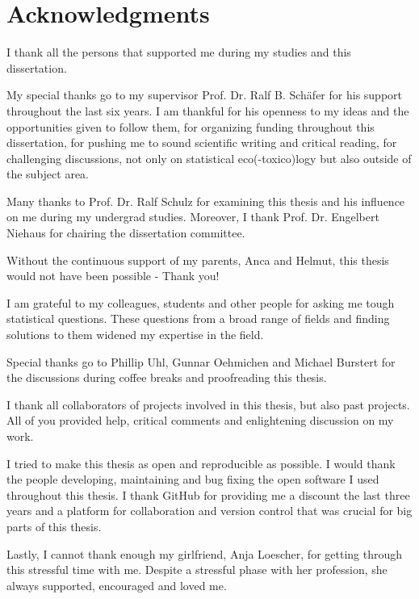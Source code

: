 


\begingroup
\let\clearpage\relax
\let\cleardoublepage\relax
\let\cleardoublepage\relax

\chapter*{Acknowledgments}
\thispagestyle{empty}

I thank all the persons that supported me during my studies and this dissertation.

\noindent My special thanks go to my supervisor Prof. Dr. Ralf B. Schäfer for his support throughout the last six years. 
I am thankful for his openness to my ideas and the opportunities given to follow them, 
for organizing funding throughout this dissertation, 
for pushing me to sound scientific writing and critical reading, 
for challenging discussions, not only on statistical eco(-toxico)logy but also outside of the subject area.

\noindent Many thanks to Prof. Dr. Ralf Schulz for examining this thesis and his influence on me during my undergrad studies.
Moreover, I thank Prof. Dr. Engelbert Niehaus for chairing the dissertation committee.

\noindent Without the continuous support of my parents, Anca and Helmut, this thesis would not have been possible - Thank you!

\noindent I am grateful to my colleagues, students and other people for asking me tough statistical questions. 
These questions from a broad range of fields and finding solutions to them widened my expertise in the field.

\noindent Special thanks go to Phillip Uhl, Gunnar Oehmichen and Michael Burstert for the discussions during coffee breaks and proofreading this thesis.

\noindent I thank all collaborators of projects involved in this thesis, but also past projects. All of you provided help, critical comments and enlightening discussion on my work.

\noindent I tried to make this thesis as open and reproducible as possible. I would thank the people developing, maintaining and bug fixing the open software I used throughout this thesis. I thank GitHub for providing me a discount the last three years and a platform for collaboration and version control that was crucial for big parts of this thesis. 

\noindent Lastly, I cannot thank enough my girlfriend, Anja Loescher, for getting through this stressful time with me.
Despite a stressful phase with her profession, she always supported, encouraged and loved me. 


\endgroup 

